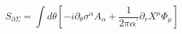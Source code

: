 \begin{equation}
S_{\partial\Sigma}=\int d\theta[-i\partial_\theta\sigma^\alpha
A_\alpha+\frac{1}{2\pi\alpha^\prime}\partial_{r}X^\mu\Phi_\mu]
\end{equation}

